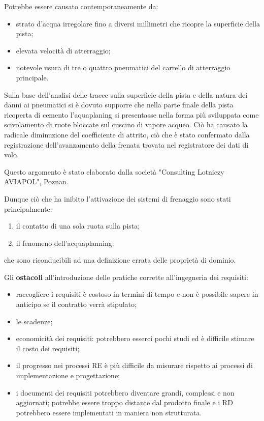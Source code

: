 Potrebbe essere causato contemporaneamente da:

\begin{itemize}
	\item strato d'acqua irregolare fino a diversi millimetri che ricopre la superficie della pista;
	\item  elevata velocità di atterraggio;
	\item  notevole usura di tre o quattro pneumatici del carrello di atterraggio principale.
\end{itemize}

Sulla base dell'analisi delle tracce sulla superficie della pista e della natura dei danni ai pneumatici si è dovuto supporre che nella parte finale della pista ricoperta di cemento l'aquaplaning si presentasse nella forma più sviluppata come scivolamento di ruote bloccate sul cuscino di vapore acqueo. Ciò ha causato la radicale diminuzione del coefficiente di attrito, ciò che è stato confermato dalla registrazione dell'avanzamento della frenata trovata nel registratore dei dati di volo.

Questo argomento è stato elaborato dalla società "Consulting Lotniczy AVIAPOL", Poznan.

Dunque ciò che ha inibito l'attivazione dei sistemi di frenaggio sono stati principalmente:
\begin{enumerate}
	\item il contatto di una sola ruota sulla pista;
	\item il fenomeno dell'acquaplanning.
\end{enumerate}
che sono riconducibili ad una definizione errata delle proprietà di dominio.

Gli \textbf{ostacoli} all'introduzione delle pratiche corrette all'ingegneria dei requisiti:
\begin{itemize}
	\item raccogliere i requisiti è costoso in termini di tempo e non è possibile sapere in anticipo se il contratto verrà stipulato;
	\item le scadenze;
	\item economicità dei requisiti: potrebbero esserci pochi studi ed è difficile stimare il costo dei requisiti;
	\item il progresso nei processi RE è più difficile da misurare rispetto ai processi di implementazione e progettazione;
	\item i documenti dei requisiti potrebbero diventare grandi, complessi e non aggiornati; potrebbe essere troppo distante dal prodotto finale e i RD potrebbero essere implementati in maniera non strutturata.
\end{itemize}
